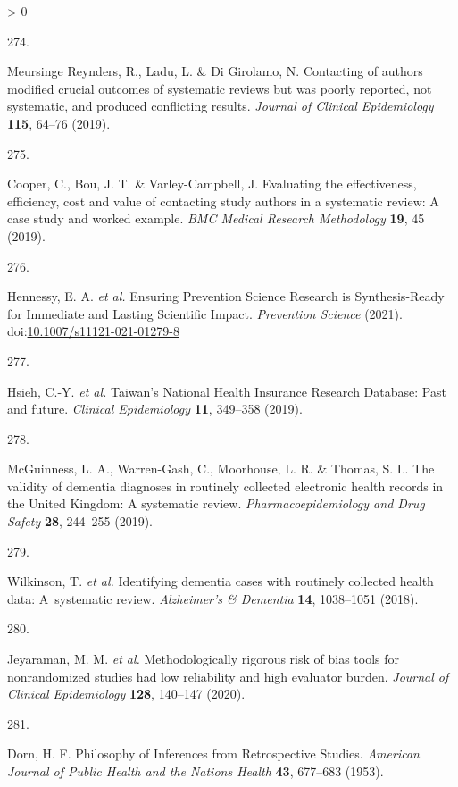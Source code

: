 \documentclass[a4paper, twoside]{templates/ociamthesis}
\newlength{\cslhangindent}
\newlength{\csllabelwidth}
\newenvironment{CSLReferences}[3] %
 {%
  \setlength{\parindent}{0pt}
  \ifodd #1 \everypar{\setlength{\hangindent}{\cslhangindent}}\ignorespaces\fi
  \ifnum #2 > 0
  \setlength{\parskip}{#2\baselineskip}
  \fi
 }%
 {}
\newcommand{\CSLLeftMargin}[1]{\parbox[t]{\maxof{\widthof{#1}}{\csllabelwidth}}{#1}}
\newcommand{\CSLRightInline}[1]{\parbox[t]{\linewidth - \csllabelwidth}{#1}}
\begin{document}
\begin{CSLReferences}{0}{0}
\leavevmode\hypertarget{ref-meursingereynders2019}{}%
\CSLLeftMargin{274. }
\CSLRightInline{Meursinge Reynders, R., Ladu, L. \& Di Girolamo, N. Contacting of authors modified crucial outcomes of systematic reviews but was poorly reported, not systematic, and produced conflicting results. \emph{Journal of Clinical Epidemiology} \textbf{115}, 64--76 (2019).}

\leavevmode\hypertarget{ref-cooper2019}{}%
\CSLLeftMargin{275. }
\CSLRightInline{Cooper, C., Bou, J. T. \& Varley-Campbell, J. Evaluating the effectiveness, efficiency, cost and value of contacting study authors in a systematic review: A case study and worked example. \emph{BMC Medical Research Methodology} \textbf{19}, 45 (2019).}

\leavevmode\hypertarget{ref-hennessy2021}{}%
\CSLLeftMargin{276. }
\CSLRightInline{Hennessy, E. A. \emph{et al.} Ensuring {Prevention Science Research} is {Synthesis}-{Ready} for {Immediate} and {Lasting Scientific Impact}. \emph{Prevention Science} (2021). doi:\href{https://doi.org/10.1007/s11121-021-01279-8}{10.1007/s11121-021-01279-8}}

\leavevmode\hypertarget{ref-hsieh2019}{}%
\CSLLeftMargin{277. }
\CSLRightInline{Hsieh, C.-Y. \emph{et al.} Taiwan's {National Health Insurance Research Database}: Past and future. \emph{Clinical Epidemiology} \textbf{11}, 349--358 (2019).}

\leavevmode\hypertarget{ref-mcguinness2019validity}{}%
\CSLLeftMargin{278. }
\CSLRightInline{McGuinness, L. A., Warren-Gash, C., Moorhouse, L. R. \& Thomas, S. L. The validity of dementia diagnoses in routinely collected electronic health records in the {United Kingdom}: A systematic review. \emph{Pharmacoepidemiology and Drug Safety} \textbf{28}, 244--255 (2019).}

\leavevmode\hypertarget{ref-wilkinson2018}{}%
\CSLLeftMargin{279. }
\CSLRightInline{Wilkinson, T. \emph{et al.} Identifying dementia cases with routinely collected health data: A~systematic review. \emph{Alzheimer's \& Dementia} \textbf{14}, 1038--1051 (2018).}

\leavevmode\hypertarget{ref-jeyaraman2020}{}%
\CSLLeftMargin{280. }
\CSLRightInline{Jeyaraman, M. M. \emph{et al.} Methodologically rigorous risk of bias tools for nonrandomized studies had low reliability and high evaluator burden. \emph{Journal of Clinical Epidemiology} \textbf{128}, 140--147 (2020).}

\leavevmode\hypertarget{ref-dorn1953}{}%
\CSLLeftMargin{281. }
\CSLRightInline{Dorn, H. F. Philosophy of {Inferences} from {Retrospective Studies}. \emph{American Journal of Public Health and the Nations Health} \textbf{43}, 677--683 (1953).}


\end{CSLReferences}
\end{document}

